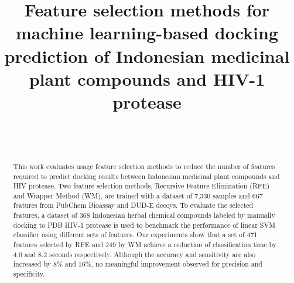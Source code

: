 \documentclass[conference]{IEEEtran}
\begin{document}
\title{Feature selection methods for machine learning-based docking prediction of Indonesian medicinal plant compounds and HIV-1 protease}



\author{
	\and
}

\author{
	\\
	
	\\
	
}

\maketitle

\begin{abstract}
	
	This work evaluates usage feature selection methods to reduce the number of features required to predict docking results between Indonesian medicinal plant compounds and HIV protease. Two feature selection methods, Recursive Feature Elimination (RFE) and Wrapper Method (WM), are trained with a dataset of 7,330 samples and 667 features from PubChem Bioassay and DUD-E decoys. To evaluate the selected features, a dataset of 368 Indonesian herbal chemical compounds labeled by manually docking to PDB HIV-1 protease is used to benchmark the performance of linear SVM classifier using different sets of features. Our experiments show that a set of 471 features selected by RFE and 249 by WM achieve a reduction of classification time by 4.0 and 8.2 seconds respectively. Although the accuracy and sensitivity are also increased by 8\% and 16\%, no meaningful improvement observed for precision and specificity.  
	
\end{abstract}
\end{document}
